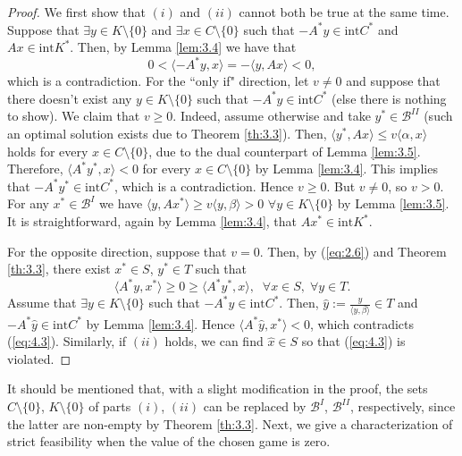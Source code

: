 \documentclass[11pt, twoside]{article}
\numberwithin{equation}{section}
\theoremstyle{definition}
\begin{document}
\begin{proof}
We first show that $(i)$ and $(ii)$ cannot both be true at the same time. Suppose that $\exists y\in K\setminus\{0\}$ and $\exists x\in C\setminus\{0\}$ such that $-A^*y\in \text{int}C^*$ and $Ax\in \text{int}K^*$. Then, by Lemma \ref{lem:3.4} we have that
\begin{equation}\label{eq:4.2}
        0< \langle -A^*y,x\rangle = - \langle y,Ax\rangle < 0,
\end{equation}
which is a contradiction. For the ``only if" direction, let $v\neq0$ and suppose that there doesn't exist any $y\in K\setminus\{0\}$ such that $-A^*y\in \text{int}C^*$ (else there is nothing to show). We claim that $v \geq0$. Indeed, assume otherwise and take $y^*\in\mathcal{B}^{II}$ (such an optimal solution exists due to Theorem \ref{th:3.3}). Then, $\langle y^*,Ax\rangle\leq v \langle \alpha,x\rangle$ holds for every $x\in C\setminus\{0\}$, due to the dual counterpart of Lemma \ref{lem:3.5}. Therefore, $\langle A^*y^*,x\rangle< 0$ for every $x\in C\setminus\{0\}$ by Lemma \ref{lem:3.4}. This implies that $-A^*y^*\in \text{int}C^*$, which is a contradiction. Hence $v\geq0$. But $v\neq0$, so $v>0$. For any $x^*\in\mathcal{B}^{I}$ we have $\langle y,Ax^*\rangle \geq v\langle y,\beta\rangle>0$ $\forall y\in K\setminus\{0\}$ by Lemma \ref{lem:3.5}. It is straightforward, again by Lemma \ref{lem:3.4}, that $Ax^*\in \text{int}K^*$.\par
     For the opposite direction, suppose that $v=0$. Then, by (\ref{eq:2.6}) and Theorem \ref{th:3.3}, there exist $x^*\in S$, $y^*\in T$ such that 
    \begin{equation}\label{eq:4.3}
        \langle A^*y,x^*\rangle \geq 0\geq \langle A^*y^*,x\rangle,\;\;\forall x\in S,\;\forall y\in T.
    \end{equation}
    Assume that $\exists y\in K\setminus\{0\}$ such that $-A^*y\in \text{int}C^*$. Then, $\hat{y}:= \displaystyle\frac{y}{\langle y,\beta\rangle}\in T$ and $-A^*\hat{y}\in \text{int}C^*$ by Lemma \ref{lem:3.4}. Hence $\langle A^*\hat{y},x^*\rangle<0$, which contradicts (\ref{eq:4.3}). Similarly, if $(ii)$ holds, we can find $\hat{x}\in S$ so that (\ref{eq:4.3}) is violated.    
\end{proof}


It should be mentioned that, with a slight modification in the proof, the sets $C\setminus\{0\}$, $K\setminus\{0\}$ of parts $(i)$, $(ii)$ can be replaced by $\mathcal{B}^I$, $\mathcal{B}^{II}$, respectively, since the latter are non-empty by Theorem \ref{th:3.3}. Next, we give a characterization of strict feasibility when the value of the chosen game is zero.
\end{document}
